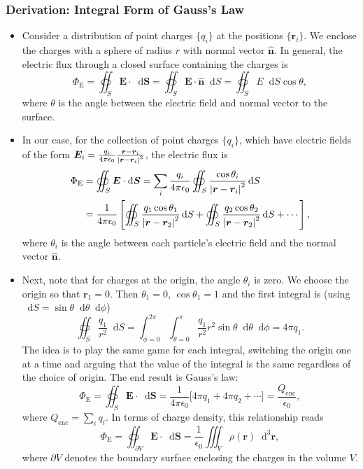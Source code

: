 \documentclass[11pt, a4paper]{article}
\newcommand{\diff}{\mathop{}\!\mathrm{d}} %
\newcommand{\dr}{\diff^{3} \r}  %
\renewcommand{\vec}[1]{\bm{#1}} %
\newcommand{\uvec}[1]{\hat{\vec{#1}}} %
\renewcommand{\r}{\vec{r}}
\newcommand{\E}{\vec{E}} %
\renewcommand{\S}{\mathbf{S}}  %
\newcommand{\ee}{\epsilon_{0}}  %
\begin{document}
\subsubsection{Derivation: Integral Form of Gauss's Law}
\begin{itemize}
	\item Consider a distribution of point charges $ \{q_{i}\} $ at the positions $ \{\r_{i}\} $. We enclose the charges with a sphere of radius $ r $ with normal vector $ \uvec{n} $. In general, the electric flux through a closed surface containing the charges is
	\begin{equation*}
		\Phi_{\text{E}} = \oiint_{S} \E \cdot \diff \vec{S} = \oiint_{S} \E \cdot \uvec{n} \diff S = \oiint_{S} E \diff S \cos \theta,
	\end{equation*}
	where $ \theta $ is the angle between the electric field and normal vector to the surface.
	
    \item In our case, for the collection of point charges $ \{q_{i}\} $, which have electric fields of the form $ \E_{i} = \frac{q_{i}}{4\pi \ee}\frac{\r - \r_{i}}{\abs{\r - \r_{i}}^{3}} $, the electric flux is
	\begin{align*}
		\Phi_{\text{E}} &= \oiint_{S} \E \cdot \diff \vec{S} = \sum_{i} \frac{q_{i}}{4\pi \ee} \oiint_{S} \frac{\cos \theta_{i}}{\abs{\r - \r_{i}}^{2}} \diff S \\
		& = \frac{1}{4\pi \ee} \left[ \oiint_{S} \frac{ q_{1} \cos \theta_{1}}{\abs{\r - \r_{2}}^{2}} \diff S + \oiint_{S} \frac{ q_{2} \cos \theta_{2}}{\abs{\r - \r_{2}}^{2}} \diff S  + \cdots \right],
	\end{align*}
	where $ \theta_{i} $ is the angle between each particle's electric field and the normal vector $ \uvec{n} $. 
	
	\item Next, note that for charges at the origin, the angle $ \theta_{i} $  is zero. We choose the origin so that $ \r_{1} = 0 $. Then $ \theta_{1} = 0 $, $ \cos \theta_{1} = 1 $ and the first integral is (using $ \diff S = \sin \theta \diff \theta \diff \phi $)
	\begin{equation*}
		\oiint_{S} \frac{q_{1}}{r^{2}} \diff S = \int_{\phi = 0}^{2\pi} \int_{\theta = 0}^{\pi} \frac{q_{1}}{r^{2}}r^{2} \sin \theta \diff \theta \diff \phi = 4\pi q_{1}.
	\end{equation*}
	The idea is to play the same game for each integral, switching the origin one at a time and arguing that the value of the integral is the same regardless of the choice of origin. The end result is Gauss's law:
	\begin{equation*}
		\Phi_{\text{E}} = \oiint_{S} \E \cdot \diff \S = \frac{1}{4\pi \ee} \big[4\pi q_{1} + 4\pi q_{2} + \cdots \big] = \frac{Q_{\text{enc}}}{\ee},
	\end{equation*}
	where $ Q_{\text{enc}} = \sum_{i} q_{i} $. In terms of charge density, this relationship reads
	\begin{equation*}
		\Phi_{\text{E}} = \oiint_{\partial V} \E \cdot \diff \vec{S} = \frac{1}{\ee}\iiint_{V} \rho(\r) \dr,
	\end{equation*}
	where $ \partial V $ denotes the boundary surface enclosing the charges in the volume $ V $.
	

\end{itemize}
\end{document}
